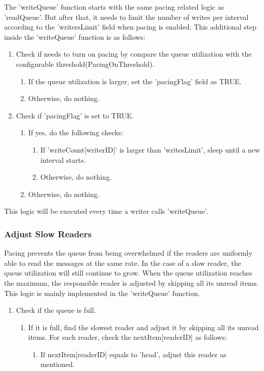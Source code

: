 The 'writeQueue' function starts with the same pacing related logic as 'readQueue'. But after that, it needs to limit the number of writes per interval according to the 'writersLimit' field when pacing is enabled. This additional step inside the 'writeQueue' function is as follows:
\begin{enumerate}	
	\item{Check if needs to turn on pacing by compare the queue utilization with the configurable threshold(PacingOnThreshold).}
			\begin{enumerate}
			\item{If the queue utilization is larger, set the 'pacingFlag' field as TRUE. }
			\item{Otherwise, do nothing.}
			\end{enumerate}
			
	\item{Check if 'pacingFlag' is set to TRUE. }
		\begin{enumerate}
		\item{If yes,  do the following checks:}
				\begin{enumerate}
					\item{If 'writeCount[writerID]' is larger than 'writesLimit', sleep until a new interval starts.}
					\item{Otherwise, do nothing.}
				\end{enumerate}									
		\item{Otherwise, do nothing.}
		\end{enumerate}
\end{enumerate}
This logic will be executed every time a writer calls 'writeQueue'.
  
\subsubsection{\label{sub:queue:control:adjust}{Adjust Slow Readers}}
Pacing prevents the queue from being overwhelmed if the readers are uniformly able to read the messages at the same rate.  In the case of a slow reader, the queue utilization will still continue to grow.  When the queue utilization reaches the maximum, the responsible reader is adjusted by skipping all its unread items.
This logic is mainly implemented in the 'writeQueue' function.
\begin{enumerate}
	  \item{Check if the queue is full.}
	     \begin{enumerate}
	     \item{If it is full, find the slowest reader and adjust it by skipping all its unread items. For each reader, check the nextItem[readerID] as follows:}
	     		\begin{enumerate}
	     			\item{ If nextItem[readerID] equals to 'head', adjust this reader as mentioned.}
			\end{enumerate}	
	     \end{enumerate}
\end{enumerate}

